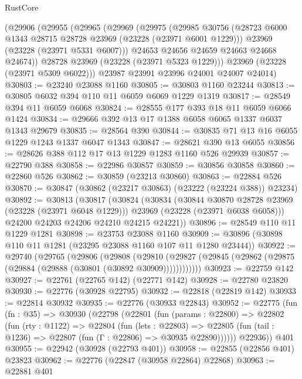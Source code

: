 \begin{lexlean}{RustCore}
\begin{coremodule}
    (@29906
      (@29955
        (@29965
          (@29969
            (@29975
              (@29985
                @30756
                (@28723 @6000 @1343 @28715 @28728 @23969 (@23228 (@23971 @6001 @1229)))
                @23969
                (@23228 (@23971 @5331 @6007)))
              @24653
              @24656
              @24659
              @24663
              @24668
              @24674))
          @28728
          @23969
          (@23228 (@23971 @5323 @1229)))
        @23969
        (@23228 (@23971 @5309 @6022)))
      @23987
      @23991
      @23996
      @24001
      @24007
      @24014)
@30803 := @23240 @23088 @1160
@30805 := @30803 @1160 @23244
@30813 := @30805 @6032 @394 @110 @11 @6059 @6069 @1229 @1319
@30817 := @28549 @394 @11 @6059 @6068
@30824 := @28555 @177 @393 @18 @11 @6059 @6066 @1424
@30834 := @29666 @392 @13 @17 @1388 @6058 @6065 @1337 @6037 @1343 @29679
@30835 := @28564 @390
@30844 := @30835 @71 @13 @16 @6055 @1229 @1243 @1337 @6047 @1343
@30847 := @28621 @390 @13 @6055
@30856 := @28626 @388 @112 @17 @13 @1229 @1283 @1160 @526 @29939
@30857 := @22790 @388
@30858 := @22986 @30857
@30859 := @30856 @30858
@30860 := @22860 @526
@30862 := @30859 (@23213 @30860)
@30863 := @22884 @526
@30870 := @30847 (@30862 (@23217 @30863) (@23222 (@23224 @388)) @23234)
@30892 := @30813
    (@30817
      (@30824
        (@30834
          (@30844 @30870 @28728 @23969 (@23228 (@23971 @6048 @1229)))
          @23969
          (@23228 (@23971 @6038 @6058)))
        @24200
        @24203
        @24206
        @24210
        @24215
        @24221))
@30896 := @28549 @110 @11 @1229 @1281
@30898 := @23753 @23088 @1160
@30909 := @30896 (@30898 @110 @11 @1281 (@23295 @23088 @1160 @107 @11 @1280 @23444))
@30922 := @29740
    (@29765
      (@29806
        (@29808
          (@29810 (@29827 (@29845 (@29862 (@29875 (@29884 (@29888 (@30801 (@30892 @30909))))))))))))
@30923 := @22759 @142
@30927 := @22761 (@22765 @142) (@22771 @142)
@30928 := @22780 @23820
@30930 := @22776 (@30928 @22795)
@30932 := @22818 (@22819 @142)
@30933 := @22814 @30932
@30935 := @22776 (@30933 @22843)
@30952 := @22775
    (fun (fn : @35) =>
    @30930
      (@22798
        (@22801
          (fun (params : @22800) =>
          @22802
            (fun (rty : @1122) =>
            @22804
              (fun (lets : @22803) =>
              @22805 (fun (tail : @1236) => @22807 (fun (Γ : @22806) => @30935 @22890))))))
        @22936))
    @401
@30955 := @22942 (@30928 (@22793 @401))
@30958 := @22855 (@22856 @401) @23823
@30962 := @22776 (@22847 (@30958 @22864) @22868)
@30963 := @22881 @401

\end{coremodule}
\end{lexlean}
